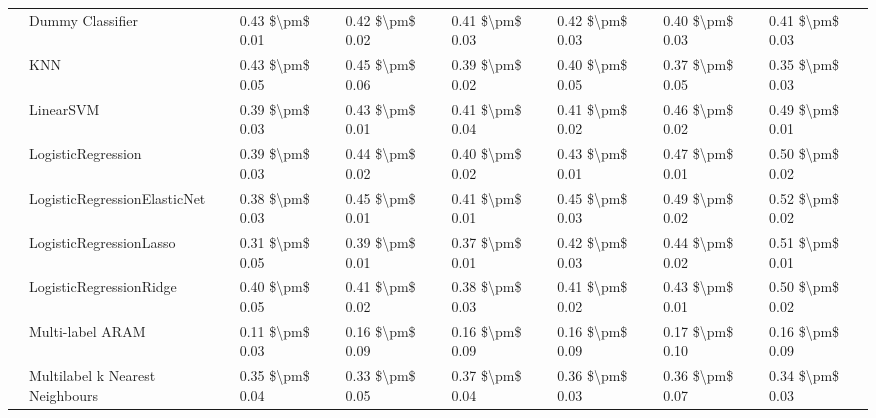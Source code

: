 \begin{tabular}{llllllll}
   & Dummy Classifier &  0.43 \$\textbackslash pm\$ 0.01 &           0.42 \$\textbackslash pm\$ 0.02 &       0.41 \$\textbackslash pm\$ 0.03 &        0.42 \$\textbackslash pm\$ 0.03 &                         0.40 \$\textbackslash pm\$ 0.03 &      0.41 \$\textbackslash pm\$ 0.03 \\
   & KNN &  0.43 \$\textbackslash pm\$ 0.05 &           0.45 \$\textbackslash pm\$ 0.06 &       0.39 \$\textbackslash pm\$ 0.02 &        0.40 \$\textbackslash pm\$ 0.05 &                         0.37 \$\textbackslash pm\$ 0.05 &      0.35 \$\textbackslash pm\$ 0.03 \\
   & LinearSVM &  0.39 \$\textbackslash pm\$ 0.03 &           0.43 \$\textbackslash pm\$ 0.01 &       0.41 \$\textbackslash pm\$ 0.04 &        0.41 \$\textbackslash pm\$ 0.02 &                         0.46 \$\textbackslash pm\$ 0.02 &      0.49 \$\textbackslash pm\$ 0.01 \\
   & LogisticRegression &  0.39 \$\textbackslash pm\$ 0.03 &           0.44 \$\textbackslash pm\$ 0.02 &       0.40 \$\textbackslash pm\$ 0.02 &        0.43 \$\textbackslash pm\$ 0.01 &                         0.47 \$\textbackslash pm\$ 0.01 &      0.50 \$\textbackslash pm\$ 0.02 \\
   & LogisticRegressionElasticNet &  0.38 \$\textbackslash pm\$ 0.03 &           0.45 \$\textbackslash pm\$ 0.01 &       0.41 \$\textbackslash pm\$ 0.01 &        0.45 \$\textbackslash pm\$ 0.03 &                         0.49 \$\textbackslash pm\$ 0.02 &      0.52 \$\textbackslash pm\$ 0.02 \\
   & LogisticRegressionLasso &  0.31 \$\textbackslash pm\$ 0.05 &           0.39 \$\textbackslash pm\$ 0.01 &       0.37 \$\textbackslash pm\$ 0.01 &        0.42 \$\textbackslash pm\$ 0.03 &                         0.44 \$\textbackslash pm\$ 0.02 &      0.51 \$\textbackslash pm\$ 0.01 \\
   & LogisticRegressionRidge &  0.40 \$\textbackslash pm\$ 0.05 &           0.41 \$\textbackslash pm\$ 0.02 &       0.38 \$\textbackslash pm\$ 0.03 &        0.41 \$\textbackslash pm\$ 0.02 &                         0.43 \$\textbackslash pm\$ 0.01 &      0.50 \$\textbackslash pm\$ 0.02 \\
   & Multi-label ARAM &  0.11 \$\textbackslash pm\$ 0.03 &           0.16 \$\textbackslash pm\$ 0.09 &       0.16 \$\textbackslash pm\$ 0.09 &        0.16 \$\textbackslash pm\$ 0.09 &                         0.17 \$\textbackslash pm\$ 0.10 &      0.16 \$\textbackslash pm\$ 0.09 \\
   & Multilabel k Nearest Neighbours &  0.35 \$\textbackslash pm\$ 0.04 &           0.33 \$\textbackslash pm\$ 0.05 &       0.37 \$\textbackslash pm\$ 0.04 &        0.36 \$\textbackslash pm\$ 0.03 &                         0.36 \$\textbackslash pm\$ 0.07 &      0.34 \$\textbackslash pm\$ 0.03 \\

\end{tabular}
